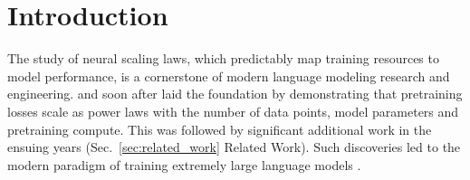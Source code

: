 \section{Introduction}
\label{sec:intro}

The study of neural scaling laws, which predictably map training resources to model performance, is a cornerstone of modern language modeling research and engineering.
\citet{hestness2017deeplearningscalingpredictable} and soon after \citet{kaplan2020scaling} laid the foundation by demonstrating that pretraining losses scale as power laws with the number of data points, model parameters and pretraining compute. This was followed by significant additional work in the ensuing years (Sec.~\ref{sec:related_work} Related Work).
Such discoveries led to the modern paradigm of training extremely large language models \citep{openai2024gpt4technicalreport, gemini2025gemini2p5, deepseekai2025deepseekv3technicalreport, yang2025qwen3technicalreport,kimiteam2025kimik2openagentic,5team2025glm45agenticreasoningcoding}.



